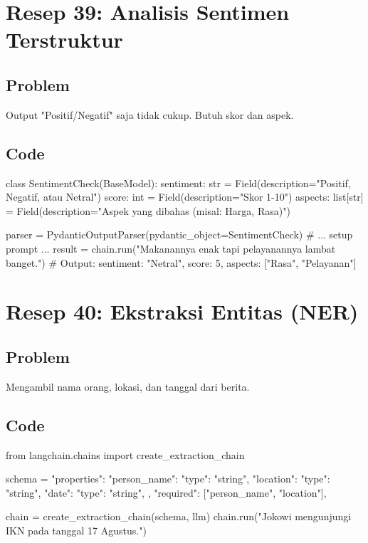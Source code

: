 \newpage

\section{Resep 39: Analisis Sentimen Terstruktur}

\subsection*{Problem}
Output "Positif/Negatif" saja tidak cukup. Butuh skor dan aspek.

\subsection*{Code}
\begin{codeblock}[language=Python]
class SentimentCheck(BaseModel):
    sentiment: str = Field(description="Positif, Negatif, atau Netral")
    score: int = Field(description="Skor 1-10")
    aspects: list[str] = Field(description="Aspek yang dibahas (misal: Harga, Rasa)")

parser = PydanticOutputParser(pydantic_object=SentimentCheck)
# ... setup prompt ...
result = chain.run("Makanannya enak tapi pelayanannya lambat banget.")
# Output: { sentiment: "Netral", score: 5, aspects: ["Rasa", "Pelayanan"] }
\end{codeblock}

\newpage

\section{Resep 40: Ekstraksi Entitas (NER)}

\subsection*{Problem}
Mengambil nama orang, lokasi, dan tanggal dari berita.

\subsection*{Code}
\begin{codeblock}[language=Python]
from langchain.chains import create_extraction_chain

schema = {
    "properties": {
        "person_name": {"type": "string"},
        "location": {"type": "string"},
        "date": {"type": "string"},
    },
    "required": ["person_name", "location"],
}

chain = create_extraction_chain(schema, llm)
chain.run("Jokowi mengunjungi IKN pada tanggal 17 Agustus.")
\end{codeblock}

